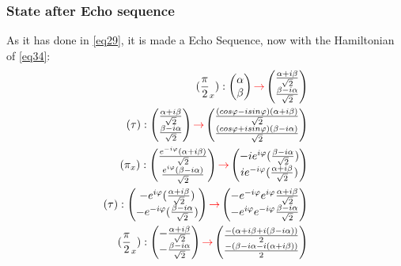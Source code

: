 \documentclass{article}
\begin{document}
\subsubsection{State after Echo sequence}
As it has done in \ref{eq29}, it is made a Echo Sequence, now with the Hamiltonian of \ref{eq34}:
\begin{equation}\label{eq38}\begin{aligned}
(\frac{\pi}{2}_x):\begin{pmatrix}\alpha \\\beta  \end{pmatrix}\textcolor{red}{\rightarrow}\begin{pmatrix}\frac{\alpha+i\beta}{\sqrt{2}} \\ \frac{\beta-i\alpha}{\sqrt{2}} \end{pmatrix}\\
(\tau):\begin{pmatrix}\frac{\alpha+i\beta}{\sqrt{2}}\\ \frac{\beta-i\alpha}{\sqrt{2}} \end{pmatrix}\textcolor{red}{\rightarrow}\begin{pmatrix}\frac{(cos\varphi-isin\varphi)(\alpha+i\beta)}{\sqrt{2}}\\\frac{(cos\varphi+isin\varphi)(\beta-i\alpha)}{\sqrt{2}} \end{pmatrix}\\
(\pi_x):\begin{pmatrix}\frac{e^{-i\varphi}(\alpha+i\beta)}{\sqrt{2}}\\\frac{e^{i\varphi}(\beta-i\alpha)}{\sqrt{2}} \end{pmatrix}\textcolor{red}{\rightarrow}\begin{pmatrix}-ie^{i\varphi}(\frac{\beta-i\alpha}{\sqrt{2}})\\ie^{-i\varphi}(\frac{\alpha+i\beta}{\sqrt{2}}) \end{pmatrix}\\
(\tau):\begin{pmatrix}-e^{i\varphi}(\frac{\alpha+i\beta}{\sqrt{2}})\\ -e^{-i\varphi}(\frac{\beta-i\alpha}{\sqrt{2}}) \end{pmatrix}\textcolor{red}{\rightarrow}\begin{pmatrix} -e^{-i\varphi}e^{i\varphi}\frac{\alpha+i\beta}{\sqrt{2}}\\ -e^{i\varphi}e^{-i\varphi}\frac{\beta-i\alpha}{\sqrt{2}} \end{pmatrix}\\
(\frac{\pi}{2}_x):\begin{pmatrix}-\frac{\alpha+i\beta}{\sqrt{2}}\\-\frac{\beta-i\alpha}{\sqrt{2}} \end{pmatrix}\textcolor{red}{\rightarrow}\begin{pmatrix}\frac{-(\alpha+i\beta+i(\beta-i\alpha))}{2} \\ \frac{-(\beta-i\alpha-i(\alpha+i\beta))}{2} \end{pmatrix}
\end{aligned}\end{equation}
\end{document}
